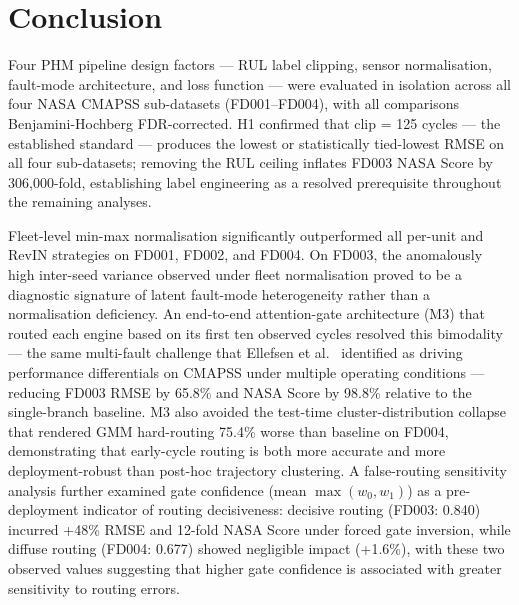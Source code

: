 \documentclass[review,12pt]{elsarticle}
\begin{document}
\section{Conclusion}

Four PHM pipeline design factors — RUL label clipping, sensor normalisation, fault-mode architecture, and loss function — were evaluated in isolation across all four NASA CMAPSS sub-datasets (FD001–FD004), with all comparisons Benjamini-Hochberg FDR-corrected. H1 confirmed that clip = 125 cycles — the established standard \cite{ref05,ref06} — produces the lowest or statistically tied-lowest RMSE on all four sub-datasets; removing the RUL ceiling inflates FD003 NASA Score by 306,000-fold, establishing label engineering as a resolved prerequisite throughout the remaining analyses.

Fleet-level min-max normalisation significantly outperformed all per-unit and RevIN strategies on FD001, FD002, and FD004. On FD003, the anomalously high inter-seed variance observed under fleet normalisation proved to be a diagnostic signature of latent fault-mode heterogeneity rather than a normalisation deficiency. An end-to-end attention-gate architecture (M3) that routed each engine based on its first ten observed cycles resolved this bimodality --- the same multi-fault challenge that Ellefsen et al.~\cite{ref07} identified as driving performance differentials on CMAPSS under multiple operating conditions --- reducing FD003 RMSE by 65.8\% and NASA Score by 98.8\% relative to the single-branch baseline. M3 also avoided the test-time cluster-distribution collapse that rendered GMM hard-routing 75.4\% worse than baseline on FD004, demonstrating that early-cycle routing is both more accurate and more deployment-robust than post-hoc trajectory clustering. A false-routing sensitivity analysis further examined gate confidence (mean $\max(w_0, w_1)$) as a pre-deployment indicator of routing decisiveness: decisive routing (FD003: 0.840) incurred +48\% RMSE and 12-fold NASA Score under forced gate inversion, while diffuse routing (FD004: 0.677) showed negligible impact (+1.6\%), with these two observed values suggesting that higher gate confidence is associated with greater sensitivity to routing errors.
\end{document}
